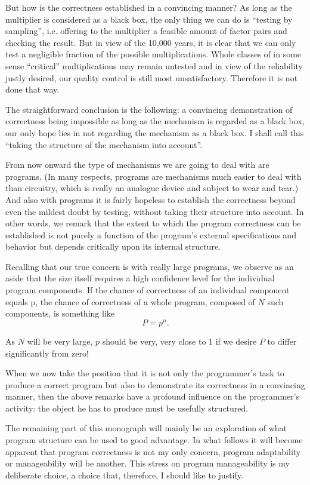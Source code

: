 But how is the correctness established in a convincing manner? As long as the multiplier is considered as a black box, the only thing we can do is ``testing by sampling'', i.e. offering to the multiplier a feasible amount of factor pairs and checking the result. But in view of the 10,000 years, it is clear that we can only test a negligible fraction of the possible multiplications. Whole classes of in some sense ``critical'' multiplications may remain untested and in view of the reliability justly desired, our quality control is still most unsatisfactory. Therefore it is not done that way.

The straightforward conclusion is the following: a convincing demonstration of correctness being impossible as long as the mechanism is regarded
as a black box, our only hope lies in not regarding the mechanism as a black box. I shall call this ``taking the structure of the mechanism into account''.

From now onward the type of mechanisms we are going to deal with are programs. (In many respects, programs are mechanisms much easier to deal
with than circuitry, which is really an analogue device and subject to wear and tear.) And also with programs it is fairly hopeless to establish the correctness beyond even the mildest doubt by testing, without taking their structure into account. In other words, we remark that the extent to which the program correctness can be established is not purely a function of the program's external specifications and behavior but depends critically upon its internal structure.

Recalling that our true concern is with really large programs, we observe as an aside that the size itself requires a high confidence level for the individual program components. If the chance of correctness of an individual component equals p, the chance of correctness of a whole program, composed of $N$ such components, is something like
$$
P=p^n.
$$

As $N$ will be very large, $p$ should be very, very close to $1$ if we desire $P$ to differ significantly from zero!

When we now take the position that it is not only the programmer's task to produce a correct program but also to demonstrate its correctness in a convincing manner, then the above remarks have a profound influence on the programmer's activity: the object he has to produce must be usefully
structured.

The remaining part of this monograph will mainly be an exploration of what program structure can be used to good advantage. In what follows it will become apparent that program correctness is not my only concern, program adaptability or manageability will be another. This stress on program manageability is my deliberate choice, a choice that, therefore, I should like to justify.

